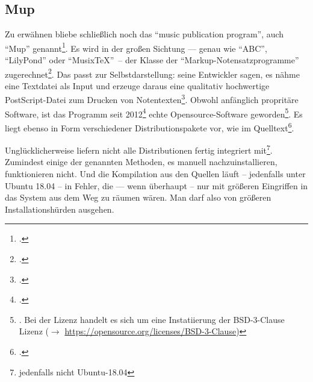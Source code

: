 %
%
%



\subsection{Mup}

Zu erwähnen bliebe schließlich noch das \enquote{music publication program},
auch \enquote{Mup} genannt\footcite[vgl.][\nopage wp]{Arkka2017a}. Es wird in
der großen Sichtung --- genau wie \enquote{ABC}, \enquote{LilyPond} oder
\enquote{Musix\TeX}\ -- der Klasse der \enquote{Markup-Notensatzprogramme}
zugerechnet\footcite[vgl.][\nopage wp]{WpedNotensatz2019a}. Das passt zur
Selbstdarstellung: seine Entwickler sagen, es nähme eine Textdatei als Input
und erzeuge daraus eine qualitativ hochwertige PostScript-Datei zum Drucken von
Notentexten\footcite[vgl.][\nopage wp]{Arkka2017a}. Obwohl anfänglich propritäre
Software, ist das Programm seit 2012\footcite[vgl.][\nopage wp]{Arkka2017a}
echte Opensource-Software geworden\footnote{\cite[vgl.][\nopage wp]{Arkka2017b}.
Bei der Lizenz handelt es sich um eine Instatiierung der BSD-3-Clause Lizenz
($\rightarrow$ \href{https://opensource.org/licenses/BSD-3-Clause}
{https://opensource.org/licenses/BSD-3-Clause})}. Es liegt ebenso in Form
verschiedener Distributionspakete vor, wie im Quelltext\footcite[vgl.][\nopage
wp]{Arkka2017c}.

Unglücklicherweise liefern nicht alle Distributionen  fertig integriert
mit\footnote{jedenfalls nicht Ubuntu-18.04}. Zumindest einige der genannten
Methoden, es manuell nachzuinstallieren, funktionieren nicht. Und die
Kompilation aus den Quellen läuft -- jedenfalls unter Ubuntu 18.04 -- in Fehler,
die --- wenn überhaupt -- nur mit größeren Eingriffen in das System aus dem Weg
zu räumen wären. Man darf also von größeren Installationshürden ausgehen.

